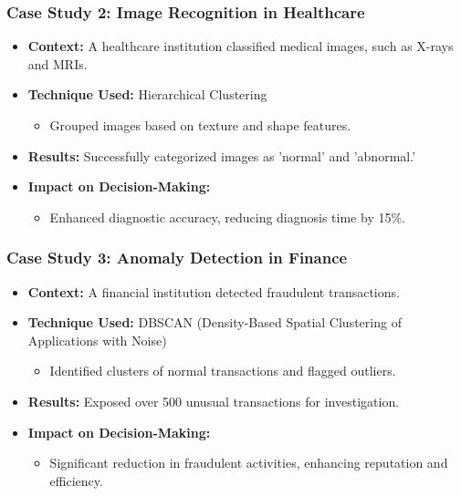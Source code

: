 \documentclass[aspectratio=169]{beamer}
\begin{document}
\begin{frame}[fragile]
    \frametitle{Case Study 2: Image Recognition in Healthcare}
    \begin{itemize}
        \item \textbf{Context:} A healthcare institution classified medical images, such as X-rays and MRIs.
        \item \textbf{Technique Used:} Hierarchical Clustering
        \begin{itemize}
            \item Grouped images based on texture and shape features.
        \end{itemize}
        \item \textbf{Results:} Successfully categorized images as 'normal' and 'abnormal.'
        \item \textbf{Impact on Decision-Making:}
        \begin{itemize}
            \item Enhanced diagnostic accuracy, reducing diagnosis time by 15\%.
        \end{itemize}
    \end{itemize}
\end{frame}

\begin{frame}[fragile]
    \frametitle{Case Study 3: Anomaly Detection in Finance}
    \begin{itemize}
        \item \textbf{Context:} A financial institution detected fraudulent transactions.
        \item \textbf{Technique Used:} DBSCAN (Density-Based Spatial Clustering of Applications with Noise)
        \begin{itemize}
            \item Identified clusters of normal transactions and flagged outliers.
        \end{itemize}
        \item \textbf{Results:} Exposed over 500 unusual transactions for investigation.
        \item \textbf{Impact on Decision-Making:}
        \begin{itemize}
            \item Significant reduction in fraudulent activities, enhancing reputation and efficiency.
        \end{itemize}
    \end{itemize}
\end{frame}
\end{document}
